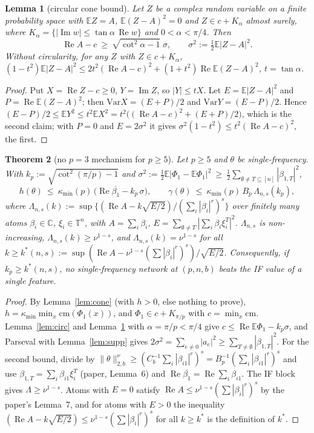 \documentclass[11pt]{article}
\newtheorem{theorem}{Theorem}
\newtheorem{lemma}[theorem]{Lemma}
\theoremstyle{definition}
\newcommand{\E}{\mathbb{E}}
\renewcommand{\Re}{\operatorname{Re}}
\renewcommand{\Im}{\operatorname{Im}}
\begin{document}
\begin{lemma}[circular cone bound]\label{lem:cc}
Let $Z$ be a complex random variable on a finite probability space with $\E Z=A$, $\E(Z-A)^2=0$ and
$Z\in c+K_\alpha$ almost surely, where $K_\alpha=\{|\Im w|\le\tan\alpha\,\Re w\}$ and $0<\alpha<\pi/4$.  Then
\[\Re A-c\ \ge\ \sqrt{\cot^2\alpha-1}\;\sigma,\qquad \sigma^2:=\tfrac12\E|Z-A|^2 .\]
Without circularity, for any $Z$ with $Z\in c+K_\alpha$,
$(1-t^2)\E|Z-A|^2\le 2t^2(\Re A-c)^2+(1+t^2)\Re\E(Z-A)^2$, $t=\tan\alpha$.
\end{lemma}
\begin{proof}
Put $X=\Re Z-c\ge0$, $Y=\Im Z$, so $|Y|\le tX$.  Let $E=\E|Z-A|^2$ and $P=\Re\E(Z-A)^2$; then
$\mathrm{Var}X=(E+P)/2$ and $\mathrm{Var}Y=(E-P)/2$.  Hence
$(E-P)/2\le\E Y^2\le t^2\E X^2=t^2\big((\Re A-c)^2+(E+P)/2\big)$, which is the second claim; with $P=0$ and
$E=2\sigma^2$ it gives $\sigma^2(1-t^2)\le t^2(\Re A-c)^2$, the first.
\end{proof}

\begin{theorem}[no $p=3$ mechanism for $p\ge5$]\label{thm:circ}
Let $p\ge5$ and $\theta$ be single-frequency.  With $k_p:=\sqrt{\cot^2(\pi/p)-1}$ and
$\sigma^2:=\frac12\E|\Phi_1-\E\Phi_1|^2\ \ge\ \frac12\sum_{\emptyset\ne T\subseteq[n]}|\beta_{1,T}|^2$,
\[
h(\theta)\ \le\ \kappa_{\min}(p)\,\big(\Re\overline{\beta_1}-k_p\,\sigma\big),
\qquad
\gamma(\theta)\ \le\ \kappa_{\min}(p)\,B_p\,\Lambda_{n,s}(k_p),
\]
where $\Lambda_{n,s}(k):=\sup\big\{(\Re A-k\sqrt{E/2})/(\sum_i|\beta_i|^{r})^{s}\big\}$ over finitely many atoms
$\beta_i\in\mathbb C$, $\xi_i\in\mathbb T^n$, with $A=\sum_i\beta_i$, $E=\sum_{\emptyset\ne T}|\sum_i\beta_i\xi_i^T|^2$.
$\Lambda_{n,s}$ is non-increasing, $\Lambda_{n,s}(k)\ge\nu^{1-s}$, and $\Lambda_{n,s}(k)=\nu^{1-s}$ for all
$k\ge k^*(n,s):=\sup(\Re A-\nu^{1-s}(\sum|\beta_i|^r)^s)/\sqrt{E/2}$.  Consequently, if $k_p\ge k^*(n,s)$, no
single-frequency network at $(p,n,b)$ beats the IF value of a single feature.
\end{theorem}
\begin{proof}
By Lemma~\ref{lem:cone} (with $h>0$, else nothing to prove), $h=\kappa_{\min}\min_x\mathrm{cm}(\Phi_1(x))$, and
$\Phi_1\in c+K_{\pi/p}$ with $c=\min_x\mathrm{cm}$.  Lemma~\ref{lem:circ} and Lemma~\ref{lem:cc} with $\alpha=\pi/p<\pi/4$
give $c\le\Re\E\Phi_1-k_p\sigma$, and Parseval with Lemma~\ref{lem:supp} gives
$2\sigma^2=\sum_{e\ne0}|a_e|^2\ge\sum_{T\ne\emptyset}|\beta_{1,T}|^2$.  For the second bound, divide by
$\|\theta\|^\nu_{2,b}\ge(C_b^{-1}\sum_i|\beta_{i1}|^r)^s=B_p^{-1}(\sum_i|\beta_{i1}|^r)^s$ and use
$\beta_{1,T}=\sum_i\beta_{i1}\xi_{i}^{T}$ (paper, Lemma~6) and $\Re\overline{\beta_1}=\Re\sum_i\beta_{i1}$.
The IF block gives $\Lambda\ge\nu^{1-s}$.  Atoms with $E=0$ satisfy $\Re A\le\nu^{1-s}(\sum|\beta_i|^r)^s$ by the paper's
Lemma~7, and for atoms with $E>0$ the inequality $(\Re A-k\sqrt{E/2})\le\nu^{1-s}(\sum|\beta_i|^r)^s$ for all
$k\ge k^*$ is the definition of $k^*$.
\end{proof}
\end{document}
